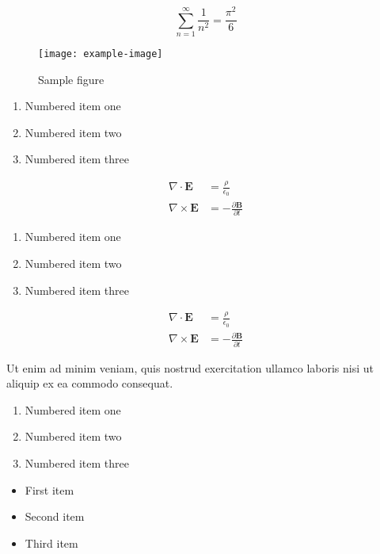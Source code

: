 \documentclass{article}
\begin{document}
\begin{equation}
    \sum_{n=1}^{\infty} \frac{1}{n^2} = \frac{\pi^2}{6}
\end{equation}

\begin{figure}[h]
    \centering
    \texttt{[image: example-image]}
    \caption{Sample figure}
    \label{fig:sample}
\end{figure}

\begin{enumerate}
\item Numbered item one
\item Numbered item two
\item Numbered item three
\end{enumerate}

\begin{align}
    \nabla \cdot \mathbf{E} &= \frac{\rho}{\epsilon_0} \\
    \nabla \times \mathbf{E} &= -\frac{\partial \mathbf{B}}{\partial t}
\end{align}

\begin{enumerate}
\item Numbered item one
\item Numbered item two
\item Numbered item three
\end{enumerate}

\begin{align}
    \nabla \cdot \mathbf{E} &= \frac{\rho}{\epsilon_0} \\
    \nabla \times \mathbf{E} &= -\frac{\partial \mathbf{B}}{\partial t}
\end{align}

Ut enim ad minim veniam, quis nostrud exercitation ullamco laboris nisi ut aliquip ex ea commodo consequat.

\begin{enumerate}
\item Numbered item one
\item Numbered item two
\item Numbered item three
\end{enumerate}

\begin{itemize}
\item First item
\item Second item
\item Third item
\end{itemize}
\end{document}
